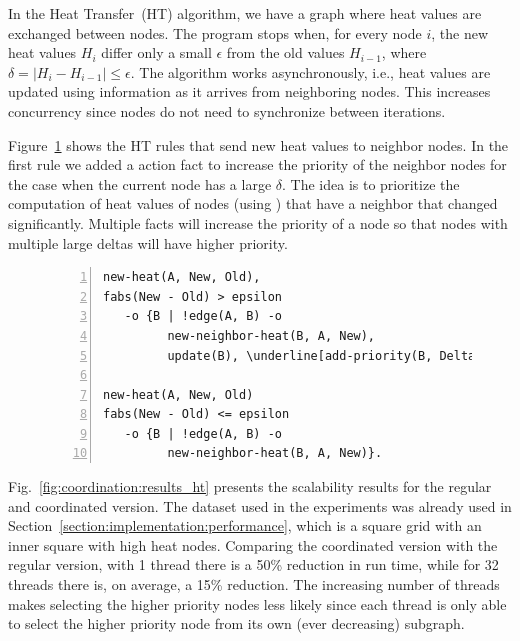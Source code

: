In the Heat Transfer~(HT) algorithm, we have a graph where heat values are
exchanged between nodes. The program stops when, for every node $i$, the new heat values $H_i$
differ only a small $\epsilon$ from the old values $H_{i-1}$, where $\delta =
|H_i - H_{i-1}| \le \epsilon$. The algorithm works asynchronously, i.e., heat
values are updated using information as it arrives from neighboring nodes. This
increases concurrency since nodes do not need to synchronize between
iterations.

Figure~\ref{code:coord:ht} shows the HT rules that send new heat values to
neighbor nodes. In the first rule we added a  action fact to
increase the priority of the neighbor nodes for the case when the current node
has a large $\delta$. The idea is to prioritize the computation of heat values
of nodes (using ) that have a neighbor that changed significantly.
Multiple  facts will increase the priority of a node so that
nodes with multiple large deltas will have higher priority.

\begin{figure}[h!]
\begin{Verbatim}[numbers=left,fontsize=\codesize,commandchars=\\\[\]]
new-heat(A, New, Old),
fabs(New - Old) > epsilon
   -o {B | !edge(A, B) -o
         new-neighbor-heat(B, A, New),
         update(B), \underline[add-priority(B, Delta)]}.

new-heat(A, New, Old)
fabs(New - Old) <= epsilon
   -o {B | !edge(A, B) -o
         new-neighbor-heat(B, A, New)}.
\end{Verbatim}
  \label{code:coord:ht}
\end{figure}

Fig.~\ref{fig:coordination:results_ht} presents the scalability results for the
regular and coordinated version. The dataset used in the experiments was already
used in Section~\ref{section:implementation:performance}, which is a square
grid with an inner square with high heat nodes. Comparing the coordinated
version with the regular version, with 1 thread there is a 50\% reduction in run
time, while for 32 threads there is, on average, a 15\% reduction. The
increasing number of threads makes selecting the higher priority nodes less
likely since each thread is only able to select the higher priority node from
its own (ever decreasing) subgraph.

